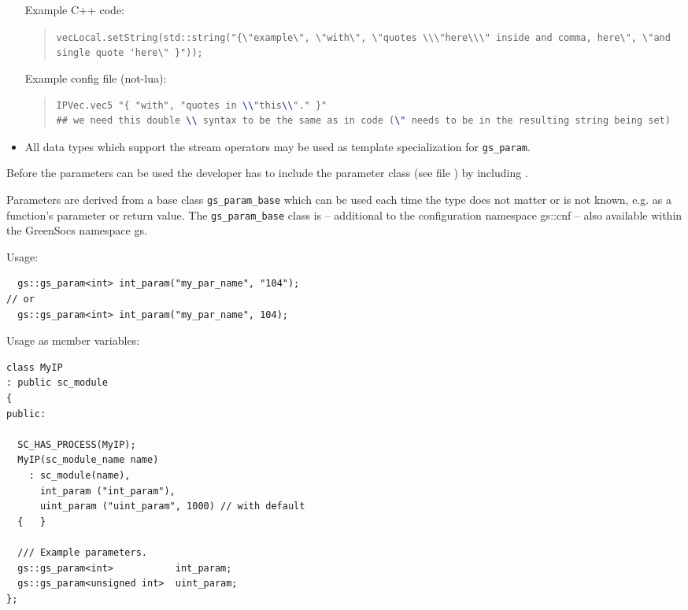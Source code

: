 \begin{itemize}
		Example C++ code:
		\begin{quote}
		\lstinline|vecLocal.setString(std::string("{\"example\", \"with\", \"quotes \\\"here\\\" inside and comma, here\", \"and single quote 'here\" }"));|
		\end{quote}
		Example config file (not-lua):
		\begin{quote}
		\begin{lstlisting}[language=TeX]
IPVec.vec5 "{ "with", "quotes in \\"this\\"." }"
## we need this double \\ syntax to be the same as in code (\" needs to be in the resulting string being set)
		\end{lstlisting}
		\end{quote}
	\item All data types which support the stream operators may be used as template specialization for \lstinline|gs_param|.
\end{itemize}

Before the parameters can be used the developer has to include the parameter class (see file ) by including .

Parameters are derived from a base class \lstinline|gs_param_base| which can be used each time the type does not matter or is not known, e.g. as a function's parameter or return value.
The \lstinline|gs_param_base| class is -- additional to the configuration namespace {\sffamily gs::cnf} -- also available within the GreenSocs namespace {\sffamily gs}.


Usage:

\begin{lstlisting}
  gs::gs_param<int> int_param("my_par_name", "104");
// or
  gs::gs_param<int> int_param("my_par_name", 104);
\end{lstlisting}

Usage as member variables:

\begin{lstlisting}
class MyIP
: public sc_module
{
public:

  SC_HAS_PROCESS(MyIP);
  MyIP(sc_module_name name)
    : sc_module(name),
      int_param ("int_param"),
      uint_param ("uint_param", 1000) // with default
  {   }

  /// Example parameters.
  gs::gs_param<int>           int_param;
  gs::gs_param<unsigned int>  uint_param;
};
\end{lstlisting}

